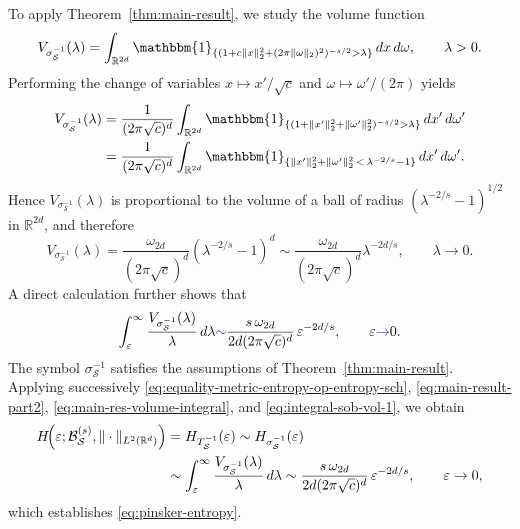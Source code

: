 \documentclass[a4paper,12pt]{article}
\let\originalleft\left
\let\originalright\right
\renewcommand{\left}{\mathopen{}\mathclose\bgroup\originalleft}
\renewcommand{\right}{\aftergroup\egroup\originalright}
\newcommand{\symbolnotsch}{\symbolnot_{\mathcal{S}}}
\newcommand{\ballsch}{\mathcal{B}^{(s)}_{\mathcal{S}}}
\newcommand{\tsch}{T_{\mathcal{S}}}
\newcommand{\symbolnot}{\sigma}
\begin{document}
To apply Theorem~\ref{thm:main-result}, we study the volume function
\begin{equation}\label{eq:integral-volume-sch-sob1}
V_{\symbolnotsch^{-1}}(\lambda)
=
\int_{\mathbb R^{2d}}
\mathbbm{1}_{\{(1+c\|x\|_2^2+(2\pi\|\omega\|_2)^2)^{-s/2}>\lambda\}}
\,dx\,d\omega,
\qquad \lambda>0.
\end{equation}
Performing the change of variables $x\mapsto x'/\sqrt c$ and
$\omega\mapsto\omega'/(2\pi)$ yields
\begin{align}
V_{\symbolnotsch^{-1}}(\lambda)
&=
\frac{1}{(2\pi\sqrt c)^d}
\int_{\mathbb R^{2d}}
\mathbbm{1}_{\{(1+\|x'\|_2^2+\|\omega'\|_2^2)^{-s/2}>\lambda\}}
\,dx'\,d\omega' \label{eq:volume-integral-sch-formula1}\\
&=
\frac{1}{(2\pi\sqrt c)^d}
\int_{\mathbb R^{2d}}
\mathbbm{1}_{\{\|x'\|_2^2+\|\omega'\|_2^2\, <\, \lambda^{-2/s}-1\}}
\,dx'\,d\omega'. \label{eq:volume-integral-sch-formula2}
\end{align}
Hence $V_{\symbolnotsch^{-1}}(\lambda)$ is proportional to the volume of a ball of
radius $(\lambda^{-2/s}-1)^{1/2}$ in $\mathbb R^{2d}$, and therefore
\[
V_{\symbolnotsch^{-1}}(\lambda)
=
\frac{\omega_{2d}}{(2\pi\sqrt c)^d}(\lambda^{-2/s}-1)^d
\sim
\frac{\omega_{2d}}{(2\pi\sqrt c)^d}\lambda^{-2d/s},
\qquad \lambda\to0.
\]
A direct calculation further shows that
\begin{equation}\label{eq:integral-sob-vol-1}
\int_{\varepsilon}^{\infty}
\frac{V_{\symbolnotsch^{-1}}(\lambda)}{\lambda}\,d\lambda
\textcolor{blue}{\sim}
\frac{s\,\omega_{2d}}{2d(2\pi\sqrt c)^d}\,\varepsilon^{-2d/s},
\qquad \varepsilon \textcolor{blue}{\to} 0.
\end{equation}
The symbol $\symbolnotsch^{-1}$ satisfies the assumptions of
Theorem~\ref{thm:main-result}.
Applying successively
\eqref{eq:equality-metric-entropy-op-entropy-sch},
\eqref{eq:main-result-part2},
\eqref{eq:main-res-volume-integral},
and \eqref{eq:integral-sob-vol-1}, we obtain
\begin{align*}
H\!\left(\varepsilon;\ballsch,\|\cdot\|_{L^2(\mathbb R^d)}\right)
&=
H_{\tsch^{-1}}(\varepsilon)
\sim
H_{\symbolnotsch^{-1}}(\varepsilon)\\
&\sim
\int_{\varepsilon}^{\infty}
\frac{V_{\symbolnotsch^{-1}}(\lambda)}{\lambda}\,d\lambda
\sim
\frac{s\,\omega_{2d}}{2d(2\pi\sqrt c)^d}\,\varepsilon^{-2d/s},
\qquad \varepsilon\to0,
\end{align*}
which establishes \eqref{eq:pinsker-entropy}.
\end{document}
